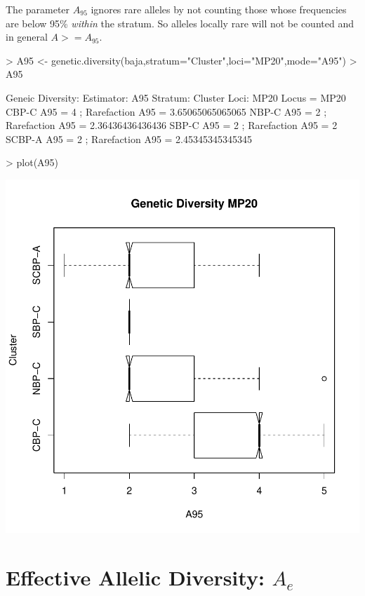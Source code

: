 \documentclass[letterpaper,twoside,openany]{book}
\begin{document}
The parameter $A_{95}$ ignores rare alleles by not counting those whose frequencies are below 95\% \emph{within} the stratum.  So alleles locally rare will not be counted and in general $A >= A_{95}$.

\begin{Schunk}
\begin{Sinput}
> A95 <- genetic.diversity(baja,stratum="Cluster",loci="MP20",mode="A95")
> A95
\end{Sinput}
\begin{Soutput}
Geneic Diversity:
  Estimator: A95 
  Stratum: Cluster 
  Loci: { MP20 }
  Locus = MP20 
    CBP-C A95 = 4 ; Rarefaction A95 = 3.65065065065065 
    NBP-C A95 = 2 ; Rarefaction A95 = 2.36436436436436 
    SBP-C A95 = 2 ; Rarefaction A95 = 2 
    SCBP-A A95 = 2 ; Rarefaction A95 = 2.45345345345345 
\end{Soutput}
\begin{Sinput}
> plot(A95)
\end{Sinput}
\end{Schunk}
\includegraphics{gstudio-024}


\section{Effective Allelic Diversity: $A_e$}
\end{document}
